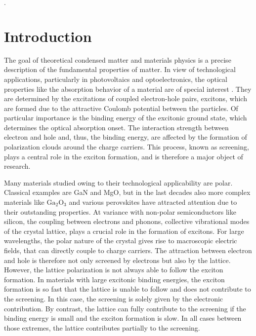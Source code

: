 \phantom.
\vspace{3cm}
\section{Introduction}
The goal of theoretical condensed matter and materials physics is a precise description of the fundamental properties of matter. In view of technological applications, particularly in photovoltaics and optoelectronics, the optical properties like  the absorption behavior of a material are of special interest \cite{CARDONA2011125}. They are determined by the excitations of coupled electron-hole pairs, excitons, which are formed due to the attractive Coulomb potential between the particles. Of particular importance is the binding energy of the excitonic ground state, which  determines the optical absorption onset. The interaction strength between electron and hole and, thus, the binding energy, are affected by the formation of polarization clouds around the charge carriers. This process, known as screening,  plays a central role in the exciton formation, and is therefore  a major object of research\cite{bechstedt2016many,reining_int_el}.\par 
Many materials studied owing to their technological applicability are polar. Classical examples are  GaN and MgO\cite{draxl_gan,fuchs_08}, but in the last decades also more complex materials like  $\text{Ga}_2\text{O}_3$\cite{ga_ex1, ga_ex2} and various perovskites\cite{exciton_perovskites}  have attracted attention due to their outstanding properties. At variance with non-polar semiconductors like silicon, the coupling between electrons and phonons, collective vibrational modes of the crystal lattice, plays a crucial role in the formation of excitons. For large wavelengths, the polar nature of the crystal gives rise to macroscopic electric fields, that can directly couple to charge carriers. The attraction between electron and hole is therefore not only screened by electrons but also by the lattice. However, the lattice polarization is not always able to follow the exciton formation. In materials with large excitonic binding energies, the exciton formation is so fast that the lattice is unable to follow and does not contribute to the screening. In this case, the screening is solely given by the electronic  contribution. By contrast, the lattice can fully contribute to the screening if the binding energy is small and the exciton formation is slow. In all cases between those extremes, the lattice contributes partially to the screening\cite{bechstedt2016many}. \par 
